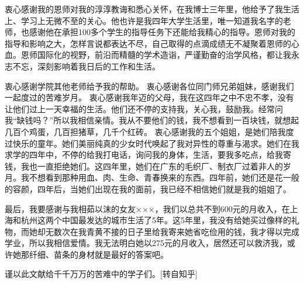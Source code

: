 \documentclass[a4paper,zihao=-4,UTF8]{ctexart}
\numberwithin{equation}{section}
\begin{document}
衷心感谢我的恩师对我的淳淳教诲和悉心关怀，在我博士三年里，他给予了我生活上、学习上无微不至的关心。他也许是我四年大学生活里，唯一知道我名字的老师，也感谢他在承担100多个学生的指导任务下还能给我精心的指导。恩师对我的指导和影响之大，怎样言说都表达不尽，自己取得的点滴成绩无不凝聚着恩师的心血。恩师国际化的视野，前沿而精髓的学术造诣，严谨勤奋的治学风格，都让我永志不忘，深刻影响着我日后的工作和生活。

衷心感谢学院其他老师给予我的帮助。 衷心感谢各位同门师兄弟姐妹，感谢我们一起度过的苦难岁月。 衷心感谢我年迈的父母，我在这四年之中不忠不孝，没有让他们过上一天幸福的生活。他们还不停的支持我，关心我，鼓励我。经常问我“缺钱吗？”所以我相信亲情。我从不要他们的钱，我不想看到一百块钱，就想起几百个鸡蛋，几百担猪草，几千个红砖。 衷心感谢我的五个姐姐，是她们陪我度过快乐的童年。她们美丽纯真的少女时代唤起了我对异性的尊重与渴求。她们在我求学的四年中，不停的给我打电话，询问我的身体，生活，要我多吃点，给我寄钱，我也一直拒绝她们。这四年里，她们在广东的毛织厂、制衣厂过着非人的岁月。我不想看到那种用血、肉、生命、青春换来的东西。四年前，她们还是花一般的容颜，四年后，当她们出现在我的面前，我已经不相信她们就是我的姐姐了。

最后，我要感谢与我相茹以沫的女友×××，我们以总共不到600元的月收入，在上海和杭州这两个中国最发达的城市生活了5年。这5年里，我没有给她买过像样的礼物，而她却无数次在我青黄不接的日子里给我寄来她省吃俭用的钱，我才得以完成学业，所以我相信爱情。我无法明白她以275元的月收入，居然还可以救济我，或许她那纤细、苗条的身材就是最好的答案吧。

谨以此文献给千千万万的苦难中的学子们。[转自知乎]
\end{document}
